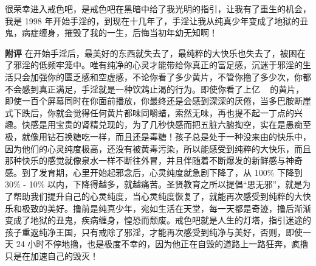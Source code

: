 \begin{case}
    很荣幸进入戒色吧，是戒色吧在黑暗中给了我光明的指引，让我有了重生的机会，我是 1998 年开始手淫的，到现在十几年了，手淫让我从纯真少年变成了地狱的丑鬼，病症缠身，摧毁了我的一生，后悔当初年幼无知啊！

    \textbf{附评} 在开始手淫后，最美好的东西就失去了，最纯粹的大快乐也失去了，被困在了邪淫的低频牢笼中。唯有纯净的心灵才能带给你真正的富足感，沉迷于邪淫的生活只会加强你的匮乏感和空虚感，不论你看了多少黄片，不管你撸了多少次，你都不会感到真正满足，手淫就是一种饮鸩止渴的行为。即使你看了上亿 \unit{\giga\byte} 的黄片，即使一百个屏幕同时在你面前播放，你最终还是会感到深深的厌倦，当多巴胺断崖式下跌后，你就会觉得任何黄片都味同嚼蜡，索然无味，再也提不起一丁点的兴趣。快感是用宝贵的肾精兑现的，为了几秒快感而把五脏六腑掏空，实在是愚痴至极，就像用钻石换糖吃一样，而且还是毒糖！孩子总是处于一种没来由的快乐中，因为他们的心灵纯度极高，还没有被黄毒污染，所以能感受到纯粹的大快乐，而且那种快乐的感觉就像泉水一样不断往外冒，并且伴随着不断爆发的新鲜感与神奇感。到了发育期，心里开始起邪念后，心灵纯度就急剧下降了，从 100\% 下降到 30\% - 10\% 以内，下降得越多，就越痛苦。圣贤教育之所以提倡“思无邪”，就是为了帮助我们提升自己的心灵纯度，当心灵纯度恢复了，就能再次感受到纯粹的大快乐和极致的美好。撸前是纯真少年，宛如生活在天堂，每一天都是奇迹，撸后渐渐变成了地狱的丑鬼，疾病缠身，惶恐而颓废。戒色吧就是人生的灯塔，指引迷途的孩子重返纯净王国，只有戒除了邪淫，才能再次感受到纯净与美好，否则，即使一天 24 小时不停地撸，也是极度不幸的，因为他正在自毁的道路上一路狂奔，疯撸只是在加速自己的毁灭！
\end{case}

